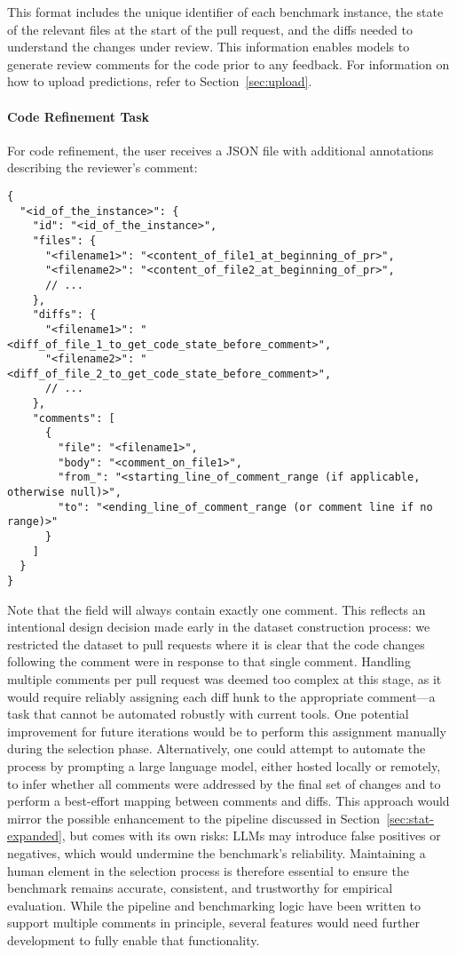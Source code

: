This format includes the unique identifier of each benchmark instance, the state of the relevant
files at the start of the pull request, and the diffs needed to understand the changes under review.
This information enables models to generate review comments for the code prior to any feedback. For
information on how to upload predictions, refer to Section~\ref{sec:upload}.

\paragraph{Code Refinement Task}

For code refinement, the user receives a JSON file with additional annotations describing the
reviewer’s comment:

\begin{verbatim}
{
  "<id_of_the_instance>": {
    "id": "<id_of_the_instance>",
    "files": {
      "<filename1>": "<content_of_file1_at_beginning_of_pr>",
      "<filename2>": "<content_of_file2_at_beginning_of_pr>",
      // ...
    },
    "diffs": {
      "<filename1>": "<diff_of_file_1_to_get_code_state_before_comment>",
      "<filename2>": "<diff_of_file_2_to_get_code_state_before_comment>",
      // ...
    },
    "comments": [
      {
        "file": "<filename1>",
        "body": "<comment_on_file1>",
        "from_": "<starting_line_of_comment_range (if applicable, otherwise null)>",
        "to": "<ending_line_of_comment_range (or comment line if no range)>"
      }
    ]
  }
}
\end{verbatim}

Note that the  field will always contain exactly one comment. This reflects an
intentional design decision made early in the dataset construction process: we restricted the
dataset to pull requests where it is clear that the code changes following the comment were in
response to that single comment. Handling multiple comments per pull request was deemed too complex
at this stage, as it would require reliably assigning each diff hunk to the appropriate comment—a
task that cannot be automated robustly with current tools. One potential improvement for future
iterations would be to perform this assignment manually during the selection phase. Alternatively,
one could attempt to automate the process by prompting a large language model, either hosted locally
or remotely, to infer whether all comments were addressed by the final set of changes and to perform
a best-effort mapping between comments and diffs. This approach would mirror the possible
enhancement to the pipeline discussed in Section~\ref{sec:stat-expanded}, but comes with its own
risks: LLMs may introduce false positives or negatives, which would undermine the benchmark's
reliability. Maintaining a human element in the selection process is therefore essential to ensure
the benchmark remains accurate, consistent, and trustworthy for empirical evaluation. While the
pipeline and benchmarking logic have been written to support multiple comments in principle, several
features would need further development to fully enable that functionality.

